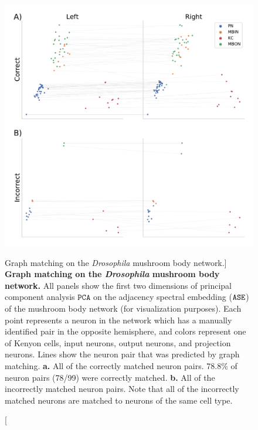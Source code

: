 \begin{figure}
    \centering
    \includegraphics[width = .8\linewidth]{figures/dnd/mb-matching.pdf}
    \caption
    [Graph matching on the \textit{Drosophila} mushroom body network.]
    {\textbf{Graph matching on the \textit{Drosophila} mushroom body network.} All panels show the first two dimensions of principal component analysis $\mathtt{PCA}$ on the adjacency spectral embedding ($\operatorname{\mathtt{ASE}}$) of the mushroom body network (for visualization purposes). Each point represents a neuron in the network which has a manually identified pair in the opposite hemisphere, and colors represent one of Kenyon cells, input neurons, output neurons, and projection neurons. 
    Lines show the neuron pair that was predicted by graph matching. 
    \textbf{a.} All of the correctly matched neuron pairs. 78.8\% of neuron pairs (78/99) were correctly matched. 
    \textbf{b.} All of the incorrectly matched neuron pairs. Note that all of the incorrectly matched neurons are matched to neurons of the same cell type.}
    \label{fig:mb-matching}
\end{figure}

